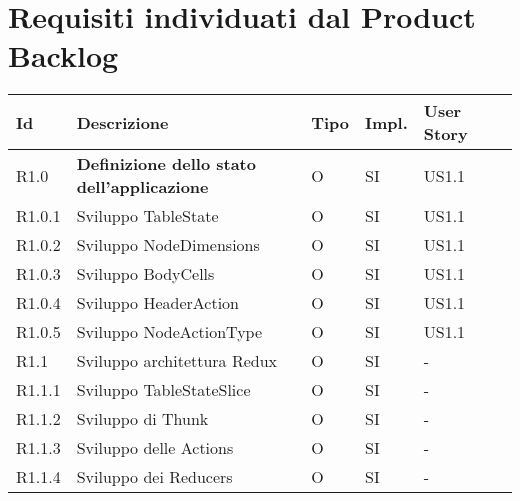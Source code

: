 \section{Requisiti individuati dal Product Backlog}
\begin{longtable} {
		|>{}p{10mm}| 
		|>{}p{60mm}|
		|>{}p{15mm}|
		|>{}p{15mm}|
		|>{}p{15mm}|
		>{}p{0mm}}
	\hline
	\textbf{Id} & \textbf{Descrizione} & \textbf{Tipo} & \textbf{Impl.} & \textbf{User Story} \\ \hline
	
	R1.0   & \textbf{Definizione dello stato dell'applicazione} & O & SI & US1.1\\ \hline
	R1.0.1 & Sviluppo TableState        & O & SI & US1.1\\ \hline
	R1.0.2 & Sviluppo NodeDimensions    & O & SI & US1.1\\ \hline
	R1.0.3 & Sviluppo BodyCells         & O & SI & US1.1\\ \hline
	R1.0.4 & Sviluppo HeaderAction      & O & SI & US1.1\\ \hline
	R1.0.5 & Sviluppo NodeActionType    & O & SI & US1.1\\ \hline
	R1.1   & Sviluppo architettura Redux & O & SI & - \\ \hline
	R1.1.1 & Sviluppo TableStateSlice    & O & SI & - \\ \hline
	R1.1.2 & Sviluppo di Thunk & O & SI & - \\ \hline
	R1.1.3 & Sviluppo delle Actions & O & SI & - \\ \hline
	R1.1.4 & Sviluppo dei Reducers & O & SI & - \\ \hline
	

\end{longtable}
